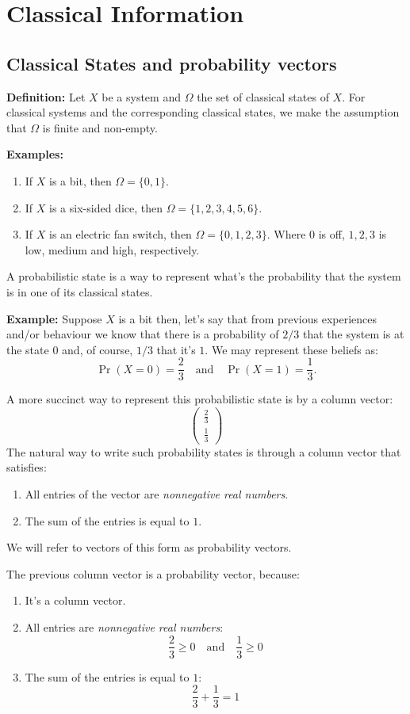\documentclass[12pt]{article} %
\begin{document}
\section{Classical Information}

\subsection{Classical States and probability vectors}
\textbf{Definition:} Let $X$ be a system and $\Omega$ the set of classical states of $X$. For classical systems and the corresponding classical states, we make the assumption that $\Omega$ is finite and non-empty.

\textbf{Examples:}
\begin{enumerate}
    \item If $X$ is a bit, then $\Omega = \{0, 1\}$.
    \item If $X$ is a six-sided dice, then $\Omega = \{1, 2, 3, 4, 5, 6\}$.
    \item If $X$ is an electric fan switch, then $\Omega = \{0, 1, 2, 3\}$. Where $0$ is off, $1, 2, 3$ is low, medium and high, respectively. 
\end{enumerate}

A probabilistic state is a way to represent what's the probability that the system is in one of its classical states.

\textbf{Example:} Suppose $X$ is a bit then, let's say that from previous experiences and/or behaviour we know that there is a probability of $2/3$ that the system is at the state $0$ and, of course, $1/3$ that it's $1$. We may represent these beliefs as:
\[
\Pr(X=0) = \frac{2}{3} \quad \text{and} \quad \Pr(X=1) = \frac{1}{3}.
\]

A more succinct way to represent this probabilistic state is by a column vector:
\[
\begin{pmatrix}
\frac{2}{3} \\
\frac{1}{3}
\end{pmatrix}
\]
The natural way to write such probability states is through a column vector that satisfies:
\begin{enumerate}
    \item All entries of the vector are \textit{nonnegative real numbers}.
    \item The sum of the entries is equal to $1$.
\end{enumerate}
We will refer to vectors of this form as probability vectors.

The previous column vector is a probability vector, because:
\begin{enumerate}
    \item It's a column vector.
    \item All entries are \textit{nonnegative real numbers}: 
    \[
    \frac{2}{3} \geq 0 \quad \text{and} \quad \frac{1}{3} \geq 0
    \]
    \item The sum of the entries is equal to $1$:
    \[
    \frac{2}{3} + \frac{1}{3} = 1
    \]
\end{enumerate}
\end{document}
